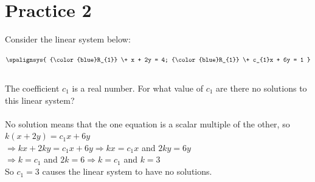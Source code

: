\documentclass{article}
\begin{document}
\section{Practice 2}
Consider the linear system below:

\[
    \spalignsys{
        {\color{blue}R_{1}} \+ x + 2y = 4;
        {\color{blue}R_{1}} \+ c_{1}x + 6y = 1
    }\]
\\
The coefficient $c_{1}$ is a real number. For what value of $c_{1}$ are there
no solutions to this linear system?
\\
\\
No solution means that the one equation is a scalar multiple of the other, so
$k(x + 2y) = c_{1}x + 6y$
\\
$\Longrightarrow kx + 2ky = c_{1}x + 6y \Longrightarrow kx = c_{1}x$ and $2ky = 6y$
\\
$\Longrightarrow k = c_{1}$ and $2k = 6 \Longrightarrow k = c_{1}$ and $k = 3$
\\
So $c_{1} = 3$ causes the linear system to have no solutions.
\end{document}
